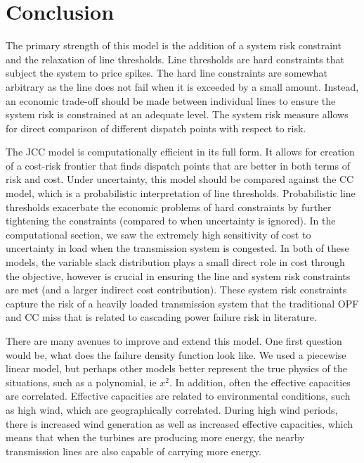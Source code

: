 \section{Conclusion}


The primary strength of this model is the addition of a system risk constraint and the relaxation of line thresholds. Line thresholds are hard constraints that subject the system to price spikes.  The hard line constraints are somewhat arbitrary as the line does not fail when it is exceeded by a small amount.  Instead, an economic trade-off should be made between individual lines to ensure the system risk is constrained at an adequate level.  The system risk measure allows for direct comparison of different dispatch points with respect to risk.

The JCC model is computationally efficient in its full form.  It allows for creation of a cost-risk frontier that finds dispatch points that are better in both terms of risk and cost.  Under uncertainty, this model should be compared against the CC model, which is a probabilistic interpretation of line thresholds.  Probabilistic line thresholds exacerbate the economic problems of hard constraints by further tightening the constraints (compared to when uncertainty is ignored).  In the computational section, we saw the extremely high sensitivity of cost to uncertainty in load when the transmission system is congested.  In both of these models, the variable slack distribution plays a small direct role in cost through the objective, however is crucial in ensuring the line and system risk constraints are met (and a larger indirect cost contribution).  These system risk constraints capture the risk of a heavily loaded transmission system that the traditional OPF and CC miss that is related to cascading power failure risk in literature.
  


There are many avenues to improve and extend this model.  One first question would be, what does the failure density function look like.  We used a piecewise linear model, but perhaps other models better represent the true physics of the situations, such as a polynomial, ie $x^2$.  In addition, often the effective capacities are correlated.  Effective capacities are related to environmental conditions, such as high wind, which are geographically correlated.  During high wind periods, there is increased wind generation as well as increased effective capacities, which means that when the turbines are producing more energy, the nearby transmission lines are also capable of carrying more energy.  

